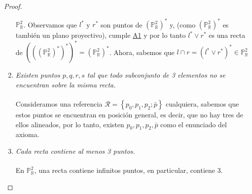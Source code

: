 \documentclass[12pt,a4paper]{article}
\newcommand{\real}{\mathbb{R}}
\newcommand\setb[1]{\left\{#1\right\}}
\newcommand{\Po}{\mathbb{P}}
\newcommand{\dualpar}[1]{\left(#1\right)^\ast}
\newcommand{\dual}[1]{#1^\ast}
\DeclareMathOperator{\join}{\vee}
\theoremstyle{break}
\newtheorem*{proof}{Solución}
\begin{document}
\begin{proof}
\begin{enumerate}[\bf {A}1)]
			$\Po^2_\real$. Observamos que $\dual{l}$ y $\dual{r}$ son
			puntos de $\dualpar{\Po^2_\real}$ y, (como
			$\dualpar{\Po^2_\real}$ es también un plano proyectivo), cumple
			\hyperref[item:a1]{A1} y por lo tanto $\dual{l} \join \dual{r}$
			es una recta de $\dualpar{\dualpar{\dualpar{\Po^2_\real}}} =
			\dualpar{\Po^2_\real}$. Ahora, sabemos que
			$l \cap r = \dualpar{\dual{l} \join \dual{r}} \in \Po^2_\real$
			\\
		\item \textit{Existen puntos $p,q,r,s$ tal que todo subconjunto de 3
			elementos no se encuentran sobre la misma recta.} \\ \\
			Consideramos una referencia
			$\mathcal{R} = \setb{p_0,p_1,p_2;\bar{p}}$ cualquiera,
			sabemos que estos puntos se encuentran en posición general, es
			decir, que no hay tres de ellos alineados, por lo tanto,
			existen $p_0,p_1,p_2,\bar{p}$ como el enunciado del axioma.
			\\
		\item \textit{Cada recta contiene al menos 3 puntos.} \\ \\
			En $\Po^2_\real$, una recta contiene infinitos puntos, en
			particular, contiene 3.\\
	\end{enumerate}
\end{proof}
\end{document}
